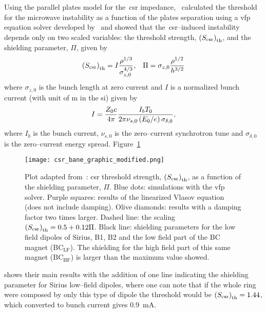     \def \Scsr {\fof{S_\text{csr}}_\text{th}}
    Using the parallel plates model for the~\gls{csr} impedance,~ calculated the threshold for the microwave instability as a function of the plates separation using a \gls{vfp} equation solver developed by~ and showed that the~\gls{csr}--induced instability depends only on two scaled variables: the threshold strength, $\Scsr$, and the shielding parameter, $\Pi$, given by
    \begin{align}\label{eq:csr_shielding_strength}
        \Scsr = I\frac{\rho^{1/3}}{\sigma_{z,0}^{4/3}}, & &  \Pi = \sigma_{z,0}\frac{\rho^{1/2}}{h^{3/2}}
    \end{align}
    where $\sigma_{z,0}$ is the bunch length at zero current and $I$ is a normalized bunch current (with unit of \si{\meter} in the \gls{si}) given by
    \begin{align}\label{eq:normalized_current}
        I = \frac{Z_0c}{4\pi}\frac{I_bT_0}{2\pi\nu_{s,0}\left(E_0/e\right)\sigma_{\delta,0}},
    \end{align}
    where $I_b$ is the bunch current, $\nu_{s,0}$ is the zero--current synchrotron tune and $\sigma_{\delta,0}$ is the zero--current energy spread. Figure~\ref{fig:csr_bane_graphic_modified}
    \begin{figure}
        \centering
        \texttt{[image: csr\_bane\_graphic\_modified.png]}
        \caption[CSR driven longitudinal instability (adapted from~).]{Plot adapted from~: \gls{csr} threshold strength, $\Scsr$, as a function of the shielding parameter, $\Pi$. Blue dots: simulations with the \gls{vfp} solver. Purple squares: results of the linearized Vlasov equation (does not include damping). Olive diamonds: results with a damping factor two times larger. Dashed line: the scaling $\Scsr = 0.5 + 0.12\Pi$. Black line: shielding parameters for the low field dipoles of Sirius, B1, B2 and the low field part of the BC magnet (BC$_\text{LF}$). The shielding for the high field part of this same magnet (BC$_\text{HF}$) is larger than the maximum value showed.}
        \label{fig:csr_bane_graphic_modified}
    \end{figure}
    shows their main results with the addition of one line indicating the shielding parameter for Sirius low--field dipoles, where one can note that if the whole ring were composed by only this type of dipole the threshold would be $\Scsr=1.44$, which converted to bunch current gives \SI{0.9}{\milli\ampere}.

